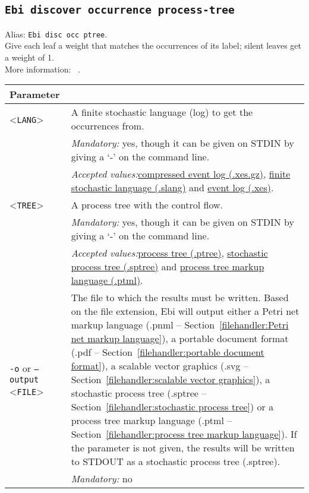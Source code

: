 {\subsection{\texttt{Ebi discover occurrence process-tree}}
\label{command:Ebi discover occurrence process-tree}
Alias: \texttt{Ebi disc occ ptree}.\\
Give each leaf a weight that matches the occurrences of its label; silent leaves get a weight of 1.\\
More information: ~\cite{DBLP:conf/icpm/BurkeLW20}.\\
\begin{tabularx}{\linewidth}{lX}
\toprule
Parameter \\\midrule
<\texttt{LANG}>&A finite stochastic language (log) to get the occurrences from.\\
&\textit{Mandatory:} \quad yes, though it can be given on STDIN by giving a `-' on the command line.\\
&\textit{Accepted values:}\quad \hyperref[filehandler:compressed event log]{compressed event log (.xes.gz)}, \hyperref[filehandler:finite stochastic language]{finite stochastic language (.slang)} and \hyperref[filehandler:event log]{event log (.xes)}.\\
<\texttt{TREE}>&A process tree with the control flow.\\
&\textit{Mandatory:} \quad yes, though it can be given on STDIN by giving a `-' on the command line.\\
&\textit{Accepted values:}\quad \hyperref[filehandler:process tree]{process tree (.ptree)}, \hyperref[filehandler:stochastic process tree]{stochastic process tree (.sptree)} and \hyperref[filehandler:process tree markup language]{process tree markup language (.ptml)}.\\
\texttt{-o} or \texttt{--output} <\texttt{FILE}> &
The file to which the results must be written. Based on the file extension, Ebi will output either a Petri net markup language (.pnml -- Section~\ref{filehandler:Petri net markup language}), a portable document format (.pdf -- Section~\ref{filehandler:portable document format}), a scalable vector graphics (.svg -- Section~\ref{filehandler:scalable vector graphics}), a stochastic process tree (.sptree -- Section~\ref{filehandler:stochastic process tree}) or a process tree markup language (.ptml -- Section~\ref{filehandler:process tree markup language}).
If the parameter is not given, the results will be written to STDOUT as a stochastic process tree (.sptree).\\
&\textit{Mandatory:} \quad no\\

\end{tabularx}}
